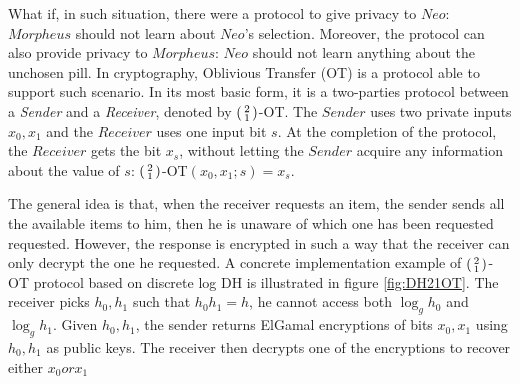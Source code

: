 What if, in such situation, there were a protocol to give privacy to
\(Neo\): \(Morpheus\) should not learn about \(Neo\)'s selection. Moreover, the
protocol can also provide privacy to \(Morpheus\): \(Neo\) should not learn
anything about the unchosen pill. In cryptography, Oblivious Transfer (OT) is a
protocol able to support such scenario. 
In its most basic form, it is a
two-parties protocol between a \textit{Sender} and a \textit{Receiver}, denoted
by \(\begin{psmallmatrix} 2 \\ 1 \end{psmallmatrix} \)-OT. The \(Sender\) uses
two private inputs \(x_{0}, x_{1}\) and the \(Receiver\) uses one input bit
\(s\). At the completion of the protocol, the \(Receiver\) gets the bit
\(x_{s}\), without letting the \(Sender\) acquire any information about the value of
\(s\): \(\begin{psmallmatrix} 2 \\ 1 \end{psmallmatrix}
\)-OT\((x_{0},x_{1};s) = x_{s}\).

The general idea is that, when the receiver requests an item, the sender sends all the available
items to him, then he is unaware of which one has been requested
requested. However, the response is encrypted in such a way that the receiver
can only decrypt the one he requested. A concrete implementation example of
\(\begin{psmallmatrix} 2 \\ 1 \end{psmallmatrix} \)-OT protocol based on
discrete log DH is illustrated in figure \ref{fig:DH21OT}. The receiver picks \(h_{0},h_{1}\) such that \(h_{0}h_{1} = h\), he cannot access both \(\log_{g}h_{0}\) and \(\log_{g}h_{1}\). Given \(h_{0}, h_{1}\), the sender returns ElGamal encryptions of bits \(x_{0}, x_{1}\) using \(h_{0},h_{1}\) as public keys. The receiver then decrypts one of the encryptions to recover either \(x_{0} or x_{1}\)

